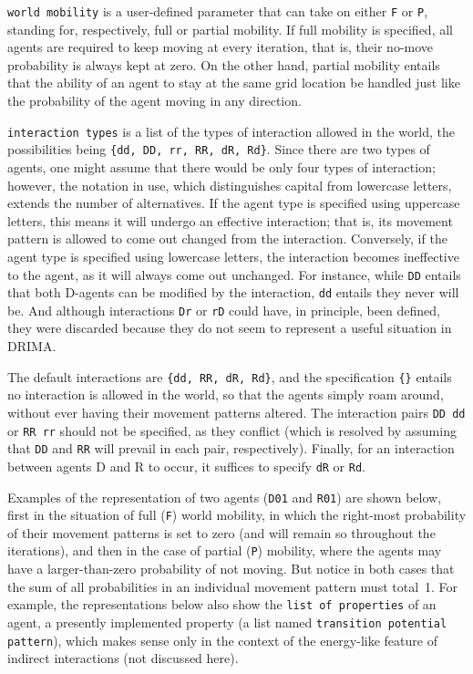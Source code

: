 \documentclass[11pt, a4paper]{article}
\begin{document}
\texttt{world mobility} is a user-defined parameter that can take on either \texttt{F} or \texttt{P}, standing for, respectively, full or partial mobility. If full mobility is specified, all agents are required to keep moving at every iteration, that is, their no-move probability is always kept at zero. On the other hand, partial mobility entails that the ability of an agent to stay at the same grid location be handled just like the probability of the agent moving in any direction.

\texttt{interaction types} is a list of the types of interaction allowed in the world, the possibilities being \texttt{\{dd, DD, rr, RR, dR, Rd\}}. Since there are two types of agents, one might assume that there would be only four types of interaction; however, the notation in use, which distinguishes capital from lowercase letters, extends the number of alternatives. If the agent type is specified using uppercase letters, this means it will undergo an effective interaction; that is, its movement pattern is allowed to come out changed from the interaction. Conversely, if the agent type is specified using lowercase letters, the interaction becomes ineffective to the agent, as it will always come out unchanged. For instance, while \texttt{DD} entails that both D-agents can be modified by the interaction, \texttt{dd} entails they never will be. And although interactions \texttt{Dr} or \texttt{rD} could have, in principle, been defined, they were discarded because they do not seem to represent a useful situation in DRIMA.

The default interactions are \texttt{\{dd, RR, dR, Rd\}}, and the specification \texttt{\{\}} entails no interaction is allowed in the world, so that the agents simply roam around, without ever having their movement patterns altered. The interaction pairs \texttt{DD dd} or \texttt{RR rr} should not be specified, as they conflict (which is resolved by assuming that \texttt{DD} and \texttt{RR} will prevail in each pair, respectively). Finally, for an interaction between agents D and R to occur, it suffices to specify \texttt{dR} or \texttt{Rd}.

Examples of the representation of two agents (\texttt{D01} and \texttt{R01}) are shown below, first in the situation of full (\texttt{F}) world mobility, in which the right-most probability of their movement patterns is set to zero (and will remain so throughout the iterations), and then in the case of partial (\texttt{P}) mobility, where the agents may have a larger-than-zero probability of not moving. But notice in both cases that the sum of all probabilities in an individual movement pattern must total~1. For example, the representations below also show the \texttt{list of properties} of an agent, a presently implemented property (a list named \texttt{transition potential pattern}), which makes sense only in the context of the energy-like feature of indirect interactions (not discussed here).
\end{document}
